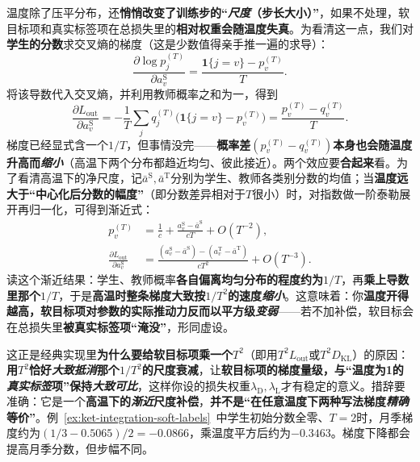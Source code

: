 温度除了压平分布，还\textbf{悄悄改变了训练步的“\emph{尺度}（步长大小）”}，如果不处理，软目标项和真实标签项在总损失里的\textbf{相对权重会随温度失真}。为看清这一点，我们对\textbf{学生的分数}求交叉熵的梯度（这是少数值得亲手推一遍的求导）：
\[
  \frac{\partial\log p_j^{(T)}}{\partial a_v^{\mathrm{S}}}
    =\frac{\mathbf{1}\{j=v\}-p_v^{(T)}}{T}.
\]
将该导数代入交叉熵，并利用教师概率之和为一，得到
\begin{equation}
  \frac{\partial L_{\mathrm{out}}}{\partial a_v^{\mathrm{S}}}
   =-\frac{1}{T}\sum_jq_j^{(T)}
      \bigl(\mathbf{1}\{j=v\}-p_v^{(T)}\bigr)
   =\frac{p_v^{(T)}-q_v^{(T)}}{T}.
  \label{eq:ket-integration-temperature-gradient}
\end{equation}
梯度已经显式含一个$1/T$，但事情没完——\textbf{概率差$(p_v^{(T)}-q_v^{(T)})$本身也会随温度升高而\emph{缩小}}（高温下两个分布都趋近均匀、彼此接近）。两个效应要\textbf{合起来}看。为了看清高温下的净尺度，记$\bar a^{\mathrm{S}},\bar a^{\mathrm{T}}$分别为学生、教师各类别分数的均值；当\textbf{温度远大于“中心化后分数的幅度”}（即分数差异相对于$T$很小）时，对指数做一阶泰勒展开再归一化，可得到渐近式：
\begin{equation}
  \begin{aligned}
    p_v^{(T)}
      &=\frac{1}{c}+\frac{a_v^{\mathrm{S}}-\bar a^{\mathrm{S}}}{cT}
          +O(T^{-2}),\\
    \frac{\partial L_{\mathrm{out}}}{\partial a_v^{\mathrm{S}}}
      &=\frac{(a_v^{\mathrm{S}}-\bar a^{\mathrm{S}})
              -(a_v^{\mathrm{T}}-\bar a^{\mathrm{T}})}
              {cT^2}+O(T^{-3}).
  \end{aligned}
  \label{eq:ket-integration-temperature-square}
\end{equation}
读这个渐近结果：学生、教师概率\textbf{各自偏离均匀分布的程度约为$1/T$}，再\textbf{乘上导数里那个$1/T$}，于是\textbf{高温时整条梯度\textbf{大致按$1/T^2$的速度\emph{缩小}}}。这意味着：你\textbf{温度开得越高，软目标项对参数的实际推动力\textbf{反而以平方级\emph{变弱}}}——若不加补偿，软目标会在总损失里\textbf{被真实标签项“淹没”}，形同虚设。

这正是经典实现里\textbf{为什么要给软目标项乘一个$T^2$}（即用$T^2L_{\mathrm{out}}$或$T^2D_{\mathrm{KL}}$）的原因：\textbf{用$T^2$恰好\emph{大致抵消}那个$1/T^2$的尺度衰减}，让\textbf{软目标项的梯度量级，与“温度为1的\emph{真实标签}项”保持\emph{大致可比}}，这样你设的损失权重$\lambda_{\mathrm{D}},\lambda_{\mathrm{L}}$才有稳定的意义。措辞要准确：它是一个\textbf{高温下的\emph{渐近}尺度补偿}，\textbf{并不是“在任意温度下两种写法梯度\emph{精确}等价”}。例~\ref{ex:ket-integration-soft-labels}~中学生初始分数全零、$T=2$时，月季梯度约为$(1/3-0.5065)/2=-0.0866$，乘温度平方后约为$-0.3463$。梯度下降都会提高月季分数，但步幅不同。

